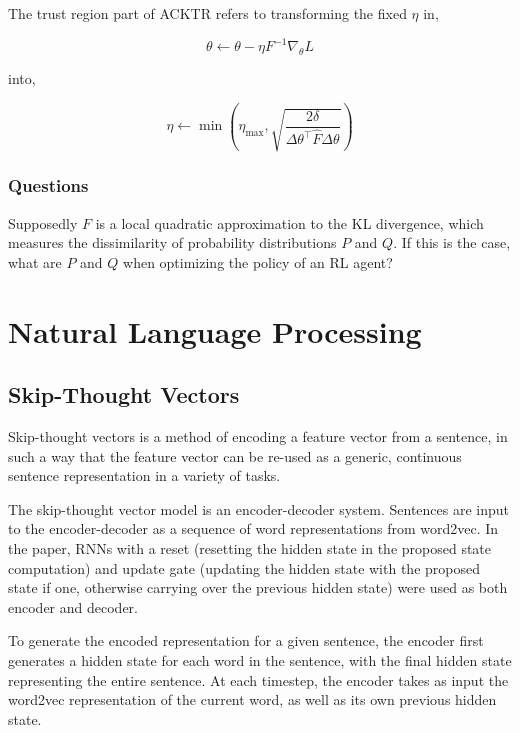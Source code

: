 \documentclass[a4paper, 12pt]{article}
\begin{document}
The trust region part of ACKTR refers to transforming the fixed $\eta$ in,

\begin{equation*}
        \theta \leftarrow \theta - \eta F^{-1} \nabla_\theta L
\end{equation*}

into,

\begin{equation*}
        \eta \leftarrow \min\left(
                \eta_{\max}, \sqrt{
                        \frac{2\delta}{\Delta\theta^{\top}
                                       \hat{F}
                                       \Delta\theta}}\right)
\end{equation*}

\subsubsection{Questions}

Supposedly $F$ is a local quadratic approximation to the KL divergence, which
measures the dissimilarity of probability distributions $P$ and $Q$. If this is
the case, what are $P$ and $Q$ when optimizing the policy of an RL agent?


\section{Natural Language Processing}


\subsection{Skip-Thought Vectors~\citet{DBLP:journals/corr/KirosZSZTUF15}}

Skip-thought vectors is a method of encoding a feature vector from a sentence,
in such a way that the feature vector can be re-used as a generic, continuous
sentence representation in a variety of tasks.

The skip-thought vector model is an encoder-decoder system. Sentences are input
to the encoder-decoder as a sequence of word representations from word2vec. In
the paper, RNNs with a reset (resetting the hidden state in the proposed state
computation) and update gate (updating the hidden state with the proposed state
if one, otherwise carrying over the previous hidden state) were used as both
encoder and decoder.

To generate the encoded representation for a given sentence, the encoder first
generates a hidden state for each word in the sentence, with the final hidden
state representing the entire sentence. At each timestep, the encoder takes as
input the word2vec representation of the current word, as well as its own
previous hidden state.
\end{document}
